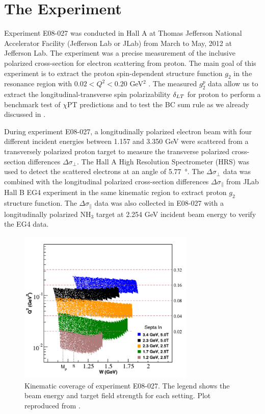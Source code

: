 
\chapter{The Experiment}
\label{C5}

Experiment E08-027 was conducted in Hall A at Thomas Jefferson National Accelerator Facility (Jefferson Lab or JLab) from March to May, 2012 at Jefferson Lab. The experiment was a precise measurement of the inclusive polarized cross-section for electron scattering from proton. The main goal of this experiment is to extract the proton spin-dependent structure function $g_2$ in the resonance region with $0.02<Q^2<0.20$ GeV${}^2$ \cite{G2P}. The measured $g_2^p$ data allow us to extract the longitudinal-transverse spin polarizability $\delta_{LT}$ for proton to perform a benchmark test of $\chi$PT predictions and to test the BC sum rule as we already discussed in .

During experiment E08-027, a longitudinally polarized electron beam with four different incident energies between 1.157 and 3.350 GeV were scattered from a transversely polarized proton target to measure the transverse polarized cross-section differences $\Delta\sigma_\perp$. The Hall A High Resolution Spectrometer (HRS) was used to detect the scattered electrons at an angle of \SI{5.77}{\degree}. The $\Delta\sigma_\perp$ data was combined with the longitudinal polarized cross-section differences $\Delta\sigma_\parallel$ from JLab Hall B EG4 experiment in the same kinematic region to extract proton $g_2$ structure function. The $\Delta\sigma_\parallel$ data was also collected in E08-027 with a longitudinally polarized NH${}_3$ target at 2.254 GeV incident beam energy to verify the EG4 data.

\begin{figure}[tb!]
  \centering
  \includegraphics[width=0.75\textwidth]{figs/kinematics-g2p.png}
  \caption[Kinematic coverage of experiment E08-027.]{Kinematic coverage of experiment E08-027. The legend shows the beam energy and target field strength for each setting. Plot reproduced from \cite{G2P}. \label{C5F1}}
\end{figure}

